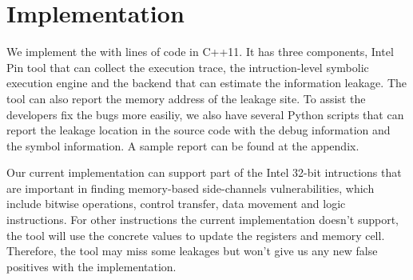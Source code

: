 \section{Implementation}
We implement the \tool{} with  lines of code in C++11. It has three components, Intel
Pin tool that can collect the execution trace, the intruction-level symbolic execution
engine and the backend that can estimate the information leakage. The tool can also report 
the memory address of the leakage site. To assist the developers fix the bugs more easiliy,
we also have several Python scripts that can report the leakage location in the source code 
with the debug information and the symbol information. A sample report can be found at the 
appendix.

\begin{table}[h]
    \centering
    \caption{\tool{}'s main components and their LoC}
\end{table}

Our current implementation can support part of the Intel 32-bit intructions that are important 
in finding memory-based side-channels vulnerabilities, which include bitwise operations, 
control transfer, data movement and logic instructions. For other 
instructions the current implementation doesn't support, 
the tool will use the concrete values to update the registers and memory cell.
Therefore, the tool may miss some leakages but won't give us any new false positives with the
implementation.
